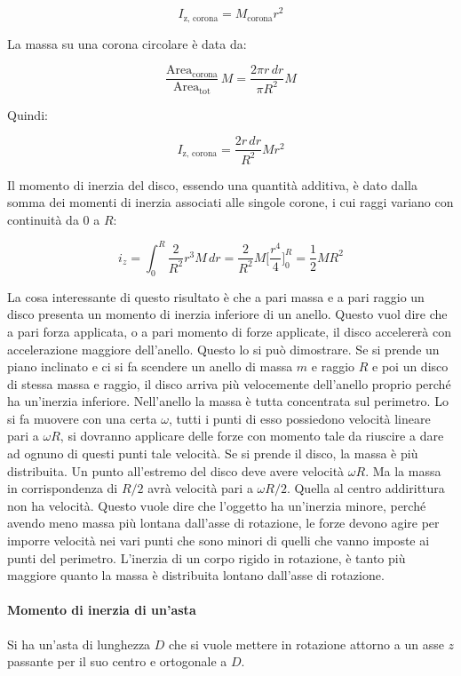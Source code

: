 \[
	I_\text{z, corona}=M_\text{corona}r^2
\]

La massa su una corona circolare è data da:

\[
	\frac{\text{Area}_\text{corona}}{\text{Area}_\text{tot}}\, M=\frac{2\pi r\,dr}{\pi R^2} M
\]

Quindi:

\[
	I_\text{z, corona}=\frac{2 r\,dr}{R^2}M r^2
\]

Il momento di inerzia del disco, essendo una quantità additiva, è dato dalla somma dei momenti di inerzia associati alle singole corone, i cui raggi variano con continuità da 0 a $R$:

\[
	i_z=\int_0^R \frac{2}{R^2}r^3M\,dr=\frac{2}{R^2}M\biggl[\frac{r^4}{4} \biggr]_0^R=\frac{1}{2}MR^2
\]

La cosa interessante di questo risultato è che a pari massa e a pari raggio un disco presenta un momento di inerzia inferiore di un anello. Questo vuol dire che a pari forza applicata, o a pari momento di forze applicate, il disco accelererà con accelerazione maggiore dell'anello. Questo lo si può dimostrare. Se si prende un piano inclinato e ci si fa scendere un anello di massa $m$ e raggio $R$ e poi un disco di stessa massa e raggio, il disco arriva più velocemente dell'anello proprio perché ha un'inerzia inferiore.
Nell'anello la massa è tutta concentrata sul perimetro. Lo si fa muovere con una certa $\omega$, tutti i punti di esso possiedono velocità lineare pari a $\omega R$, si dovranno applicare delle forze con momento tale da riuscire a dare ad ognuno di questi punti tale velocità. Se si prende il disco, la massa è più distribuita.  Un punto all'estremo del disco deve avere velocità $\omega R$. Ma la massa in corrispondenza di $R/2$ avrà velocità pari a $\omega R/2$. Quella al centro addirittura non ha velocità. Questo vuole dire che l'oggetto ha un'inerzia minore, perché avendo meno massa più lontana dall'asse di rotazione, le forze devono agire per imporre velocità nei vari punti che sono minori di quelli che vanno imposte ai punti del perimetro. L'inerzia di un corpo rigido in rotazione, è tanto più maggiore quanto la massa è distribuita lontano dall'asse di rotazione.

\paragraph{Momento di inerzia di un'asta} Si ha un'asta di lunghezza $D$ che si vuole mettere in rotazione attorno a un asse $z$ passante per il suo centro e ortogonale a $D$.


